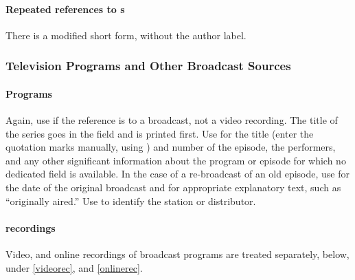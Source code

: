 \documentclass{ltxdockit}[2010/02/12]
\begin{document}
\paragraph{Repeated references to s}
There is a modified short form, without the author label.\autocites[][]{westbirdie-blue}

\subsubsection{Television Programs and Other Broadcast Sources}

\paragraph{Programs}\label{tvshows}
Again, use  if the reference is to a broadcast, not a video recording. The title of the series goes in the  field and is printed first. Use  for the title (enter the quotation marks manually, using ) and number of the episode, the performers, and any other significant information about the program or episode for which no dedicated field is available. In the case of a re-broadcast of an old episode, use  for the date of the original broadcast and  for appropriate explanatory text, such as ``originally aired.''\autocites[][]{seinfeld}
Use  to identify the station or distributor.\autocites[][]{all-things-cons}

\paragraph{recordings}
Video, and online recordings of broadcast programs are treated separately, below, under \ref{videorec}, and \ref{onlinerec}.
\end{document}
